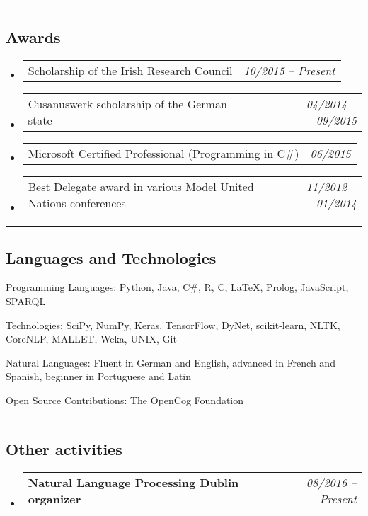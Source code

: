 \documentclass[10pt,letterpaper]{article}
\makeatletter
\newenvironment{indentsection}[1]%
{\begin{list}{}%
	{\setlength{\leftmargin}{#1}}%
	\item[]%
}
{\end{list}}
\newcommand{\headerrow}[2]
{\begin{tabular*}{\linewidth}{l@{\extracolsep{\fill}}r}
	#1 &
	#2 \\
\end{tabular*}}
\makeatother
\begin{document}
\hrule
\vspace{-0.4em}
\subsection*{Awards}

\begin{itemize}
	\parskip=0.1em
	
	\item 
	\headerrow
		{Scholarship of the Irish Research Council}
		{\emph{10/2015 -- Present}}
	\item 
	\headerrow
		{Cusanuswerk scholarship of the German state}
		{\emph{04/2014 -- 09/2015}}	
	\item 
	\headerrow
		{Microsoft Certified Professional (Programming in C\#)}
		{\emph{06/2015}}
	\item 
	\headerrow
		{Best Delegate award in various Model United Nations conferences}
		{\emph{11/2012 -- 01/2014}}

\end{itemize}

\hrule
\vspace{-0.4em}
\subsection*{Languages and Technologies}

\begin{indentsection}{\parindent}
\begin{description*}
	\item[Programming Languages:]
	Python, Java, C\#, R, C, \LaTeX, Prolog, JavaScript, SPARQL
	\item[Technologies:]
	SciPy, NumPy, Keras, TensorFlow, DyNet, scikit-learn, NLTK, CoreNLP, MALLET, Weka, UNIX, Git
	\item[Natural Languages:]
	Fluent in German and English, advanced in French and Spanish, beginner in Portuguese and Latin	
	\item[Open Source Contributions:]
	The OpenCog Foundation
\end{description*}
\end{indentsection}

\hrule
\vspace{-0.4em}
\subsection*{Other activities}

\begin{itemize}
	\parskip=0.1em
		\item 
	\headerrow
		{\textbf{Natural Language Processing Dublin organizer}}
		{\emph{08/2016 -- Present}}

\end{itemize}
\end{document}
